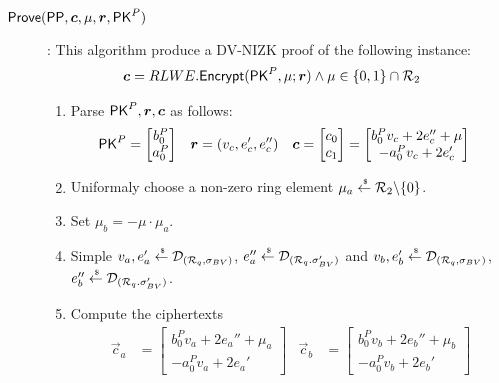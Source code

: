 \begin{description}
\item[$\Prove(\PPP, \vec{c}, \mu, \vec{r}, \PK^P)$]: This algorithm produce a DV-NIZK proof of the following instance:
  \begin{align*}
    \vec{c} &= RLWE.\Enc(\PK^P, \mu; \vec{r}) \wedge \mu \in \{0,1\}\cap \R_2
  \end{align*}
  \begin{enumerate}
  \item Parse $\PK^P, \vec{r}, \vec{c}$ as follows:
    \begin{align*}
      \PK^P &= \begin{bmatrix} b_0^P \\ a_0^P \end{bmatrix} &
      \vec{r} &= (v_c, e_c', e_c'')&
      \vec{c} &= \begin{bmatrix} c_0\\ c_1\end{bmatrix} = \begin{bmatrix} b_0^P v_c + 2 e_c'' + \mu \\ -a_0^Pv_c + 2 e_c'\end{bmatrix}
    \end{align*}
  \item Uniformaly choose a non-zero ring element $\mu_a \stackrel{{\scriptscriptstyle \mkern4mu \$}}{\gets} {\mathcal{R}}_2 \backslash \{0\}$.
  \item Set $\mu_b = - \mu \cdot \mu_a$.
  \item Simple $v_a, e_a' \stackrel{{\scriptscriptstyle \mkern4mu \$}}{\gets} \mathcal{D}_{({\mathcal{R}}_q, \sigma_{BV})}$, $e_a'' \stackrel{{\scriptscriptstyle \mkern4mu \$}}{\gets} \mathcal{D}_{({\mathcal{R}}_q. \sigma_{BV}')}$ and $v_b, e_b' \stackrel{{\scriptscriptstyle \mkern4mu \$}}{\gets} \mathcal{D}_{({\mathcal{R}}_q, \sigma_{BV})}$, $e_b'' \stackrel{{\scriptscriptstyle \mkern4mu \$}}{\gets} \mathcal{D}_{({\mathcal{R}}_q. \sigma_{BV}')}$.
  \item Compute the ciphertexts
    \begin{align*}
      \vec{c}_a &= \begin{bmatrix} b_0^Pv_a + 2 e_a'' + \mu_a \\ - a_0^Pv_a + 2 e_a'\end{bmatrix} &
        \vec{c}_b &= \begin{bmatrix} b_0^Pv_b + 2 e_b'' + \mu_b \\ - a_0^Pv_b + 2 e_b'\end{bmatrix} 

\end{align*}
\end{enumerate}
\end{description}
